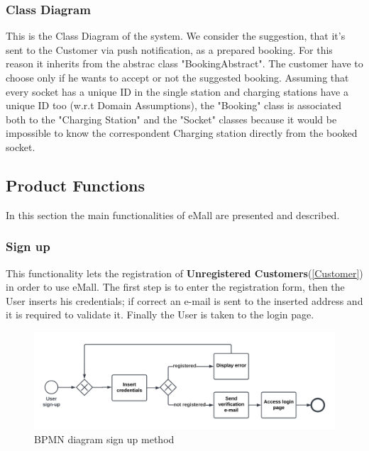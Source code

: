 \subsubsection{Class Diagram}
This is the Class Diagram of the system.
We consider the suggestion, that it's sent to the Customer via push notification, as a prepared booking. For this reason it inherits from the abstrac class "BookingAbstract". The customer have to choose only if he wants to accept or not the suggested booking.
Assuming that every socket has a unique ID in the single station and charging stations have a unique ID too (w.r.t Domain Assumptions), the "Booking" class is associated both to the "Charging Station" and the "Socket" classes because it would be impossible to know the correspondent Charging station directly from the booked socket.





\subsection{Product Functions}
In this section the main functionalities of eMall are presented and described.
\subsubsection{Sign up}
This functionality lets the registration of \textbf{Unregistered Customers}(\ref{Customer}) in order to use eMall. The first step is to enter the registration form, then the User inserts his credentials; if correct an e-mail is sent to the inserted address and it is required to validate it. 
Finally the User is taken to the login page.
\begin{figure}[H]
    \begin{center}
        \includegraphics[width=\textwidth]{img/fun-sign-up.png}
        \caption{BPMN diagram sign up method}
    \end{center}
\end{figure}
